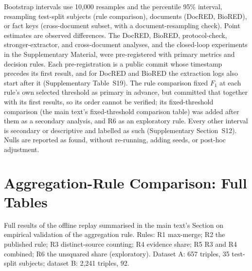 \documentclass[11pt]{article}
\begin{document}
Bootstrap intervals use 10,000 resamples and the percentile 95\%
interval, resampling test-split subjects (rule comparison), documents
(DocRED, BioRED), or fact keys (cross-document subset, with a
document-resampling check). Point estimates are observed differences.
The DocRED, BioRED, protocol-check, stronger-extractor, and
cross-document analyses, and the closed-loop experiments in the
Supplementary Material, were pre-registered with primary metrics and
decision rules. Each pre-registration is a public commit whose timestamp
precedes its first result, and for DocRED and BioRED the extraction logs
also start after it (Supplementary Table~S19). The rule comparison fixed
$F_1$ at each rule's own selected threshold as primary in advance, but
committed that together with its first results, so its order cannot be
verified; its fixed-threshold comparison
(the main text's fixed-threshold comparison table) was added after them as a
secondary analysis, and R6 as an exploratory rule. Every other interval
is secondary or descriptive and labelled as such (Supplementary
Section~S12). Nulls are reported as found, without re-running, adding
seeds, or post-hoc adjustment.

\section{Aggregation-Rule Comparison: Full Tables}
\label{sec:s2}

Full results of the offline replay summarised in the main text's Section on empirical validation of the aggregation rule. Rules: R1 max-merge; R2 the published rule; R3 distinct-source counting; R4 evidence share; R5 R3 and R4 combined; R6 the unsquared share (exploratory). Dataset A: 657 triples, 35 test-split subjects; dataset B: 2,241 triples, 92.
\end{document}
